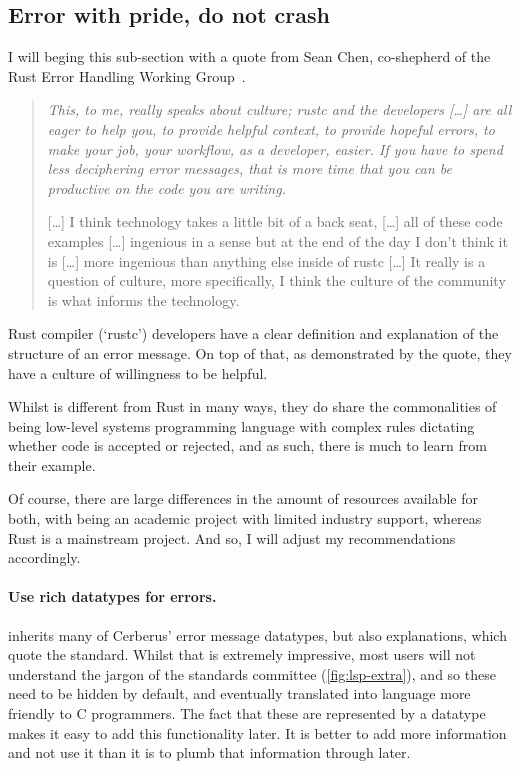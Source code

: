 \subsection{Error with pride, do not crash}\label{sec:error-msgs}

I will beging this sub-section with a quote from Sean Chen, co-shepherd
of the Rust Error Handling Working Group~.

\begin{quote}
\em
This, to me, really speaks about culture; rustc and the developers [\ldots]
are all eager to help you, to provide helpful context,
to provide hopeful errors, to make your job, your workflow, as a developer,
easier. If you have to spend less deciphering error messages, that is more time
that you can be productive on the code you are writing.

[\ldots] I think technology takes a little bit of a back seat, [\ldots] all of
these code examples [\ldots] ingenious in a sense but at the end
of the day I don't think it is [\ldots] more ingenious than anything else
inside of rustc [\ldots] It really is a question of culture, more specifically,
I think the culture of the community is what informs the technology.
\end{quote}

Rust compiler (`rustc') developers have a clear definition and explanation of
the structure of an error
message.
On top of that, as demonstrated by the quote, they have a culture of
willingness to be helpful.

Whilst  is different from Rust in many ways, they do share the
commonalities of being low-level systems programming language with complex
rules dictating whether code is accepted or rejected, and as such, there is
much to learn from their example.

Of course, there are large differences in the amount of resources available for
both, with  being an academic project with limited industry support,
whereas Rust is a mainstream project. And so, I will adjust my recommendations
accordingly.

\paragraph{Use rich datatypes for errors.}  inherits many of Cerberus'
error message datatypes, but also explanations, which quote the standard.
Whilst that is extremely impressive, most users will not understand the jargon
of the standards committee (\cref{fig:lsp-extra}), and so these need to be
hidden by default, and eventually translated into language more friendly to C
programmers. The fact that these are represented by a datatype makes it easy to
add this functionality later. It is better to add more information and not use
it than it is to plumb that information through later.

